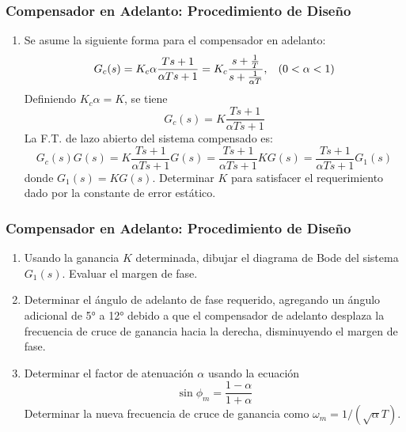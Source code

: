 \documentclass[aspectratio=169, handout]{beamer}
\theoremstyle{definition}
\theoremstyle{plain}
\theoremstyle{remark}
\newcounter{saveenumi}
\newcommand{\seti}{\setcounter{saveenumi}{\value{enumi}}}
\newcommand{\conti}{\setcounter{enumi}{\value{saveenumi}}}
\begin{document}
\begin{frame}[<+->]\frametitle{Compensador en Adelanto: Procedimiento de Diseño}
	\begin{enumerate}
		\item Se asume la siguiente forma para el compensador en adelanto:
		\begin{equation*}
			G_c(s) = K_c \alpha \frac{Ts+1}{\alpha Ts+1} = K_c \frac{s+\frac{1}{T}}{s+\frac{1}{\alpha T}}, \hspace*{3mm} (0 < \alpha < 1)
		\end{equation*}
		\pause
		Definiendo $K_c \alpha = K$, se tiene
		\begin{equation*}
			G_c(s) = K \frac{Ts+1}{\alpha Ts+1}
		\end{equation*}
		\pause
		La F.T. de lazo abierto del sistema compensado es:
		\begin{equation*}
			G_c(s)G(s) = K \frac{Ts+1}{\alpha Ts+1}G(s) = \frac{Ts+1}{\alpha Ts+1} KG(s) = \frac{Ts+1}{\alpha Ts+1} G_1(s)
		\end{equation*}
		donde $G_1(s) = KG(s)$.
		\pause
		Determinar $K$ para satisfacer el requerimiento dado por la constante de error estático.
		\seti
	\end{enumerate}
\end{frame}

\begin{frame}[<+->]\frametitle{Compensador en Adelanto: Procedimiento de Diseño}
	\begin{enumerate}
		\conti
		\item Usando la ganancia $K$ determinada, dibujar el diagrama de Bode del sistema $G_1(s)$. Evaluar el margen de fase.
		\item Determinar el ángulo de adelanto de fase requerido, agregando un ángulo adicional de \ang{5} a \ang{12} debido a que el compensador de adelanto desplaza la frecuencia de cruce de ganancia hacia la derecha, disminuyendo el margen de fase.
		\item Determinar el factor de atenuación $\alpha$ usando la ecuación
		\begin{equation*}
			\sin \phi_m = \frac{1-\alpha}{1+\alpha}
		\end{equation*}
		Determinar la nueva frecuencia de cruce de ganancia como $\omega_m = 1/(\sqrt{\alpha}T)$.
		\seti
	\end{enumerate}
\end{frame}
\end{document}
